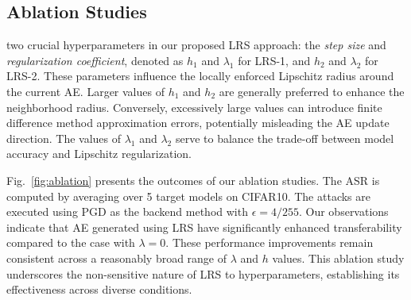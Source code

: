 \documentclass[letterpaper]{article} %
\theoremstyle{plain}
\theoremstyle{definition}
\newcommand{\fref}[1]{Fig.~\ref{#1}}
\begin{document}
\subsection{Ablation Studies}
 two crucial hyperparameters in our proposed LRS approach: the \emph{step size} and \emph{regularization coefficient}, denoted as $h_1$ and $\lambda_1$ for LRS-1, and $h_2$ and $\lambda_2$ for LRS-2. These parameters influence the locally enforced Lipschitz radius around the current AE. Larger values of $h_1$ and $h_2$ are generally preferred to enhance the neighborhood radius. Conversely, excessively large values can introduce finite difference method approximation errors, potentially misleading the AE update direction. The values of $\lambda_1$ and $\lambda_2$ serve to balance the trade-off between model accuracy and Lipschitz regularization.

\fref{fig:ablation} presents the outcomes of our ablation studies. The ASR is computed by averaging over 5 target models on CIFAR10. The attacks are executed using PGD as the backend method with $\epsilon=4/255$. Our observations indicate that AE generated using LRS have significantly enhanced transferability compared to the case with $\lambda=0$. These performance improvements remain consistent across a reasonably broad range of $\lambda$ and $h$ values. This ablation study underscores the non-sensitive nature of LRS to hyperparameters, establishing its effectiveness across diverse conditions.
\end{document}
